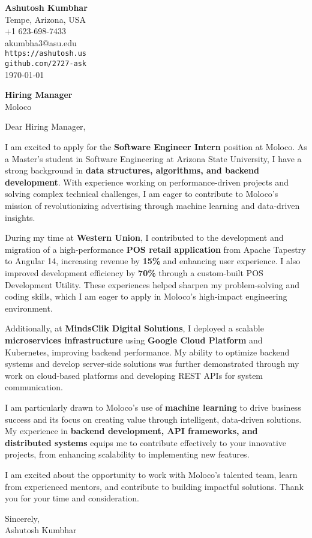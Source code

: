 \documentclass[11pt]{article}
\begin{document}
\begin{flushleft}
\textbf{Ashutosh Kumbhar} \\
Tempe, Arizona, USA \\
+1 623-698-7433 \\
akumbha3@asu.edu \\
\texttt{https://ashutosh.us} \\
\texttt{github.com/2727-ask} \\
\today
\end{flushleft}

\vspace{0.5em}

\textbf{Hiring Manager} \\
Moloco \\

\vspace{1em}

Dear Hiring Manager,

I am excited to apply for the \textbf{Software Engineer Intern} position at Moloco. As a Master's student in Software Engineering at Arizona State University, I have a strong background in \textbf{data structures, algorithms, and backend development}. With experience working on performance-driven projects and solving complex technical challenges, I am eager to contribute to Moloco’s mission of revolutionizing advertising through machine learning and data-driven insights.

During my time at \textbf{Western Union}, I contributed to the development and migration of a high-performance \textbf{POS retail application} from Apache Tapestry to Angular 14, increasing revenue by \textbf{15\%} and enhancing user experience. I also improved development efficiency by \textbf{70\%} through a custom-built POS Development Utility. These experiences helped sharpen my problem-solving and coding skills, which I am eager to apply in Moloco’s high-impact engineering environment.

Additionally, at \textbf{MindsClik Digital Solutions}, I deployed a scalable \textbf{microservices infrastructure} using \textbf{Google Cloud Platform} and Kubernetes, improving backend performance. My ability to optimize backend systems and develop server-side solutions was further demonstrated through my work on cloud-based platforms and developing REST APIs for system communication.

I am particularly drawn to Moloco’s use of \textbf{machine learning} to drive business success and its focus on creating value through intelligent, data-driven solutions. My experience in \textbf{backend development, API frameworks, and distributed systems} equips me to contribute effectively to your innovative projects, from enhancing scalability to implementing new features.

I am excited about the opportunity to work with Moloco’s talented team, learn from experienced mentors, and contribute to building impactful solutions. Thank you for your time and consideration.

Sincerely, \\
Ashutosh Kumbhar
\end{document}
